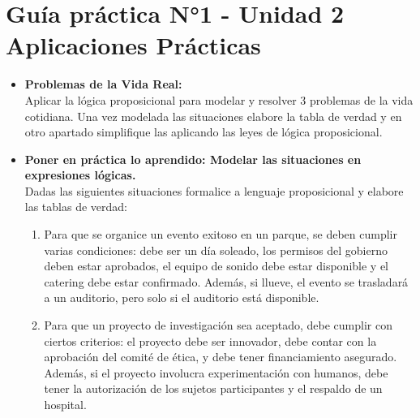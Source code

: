 \documentclass[12pt]{article}
\begin{document}
    
  
    \section*{\centering Guía práctica N°1 - Unidad 2\\Aplicaciones Prácticas}

        \vspace{0.6cm}
        \begin{itemize}
            \item \textbf{Problemas de la Vida Real:} \\Aplicar la lógica proposicional para modelar y resolver 3 problemas de la vida cotidiana. Una vez modelada las situaciones elabore la tabla de verdad y en otro apartado simplifique las aplicando las leyes de lógica proposicional.
            
            
            \item \textbf{ Poner en práctica lo aprendido: Modelar las situaciones en expresiones lógicas.}\\ Dadas las siguientes situaciones formalice a lenguaje proposicional y elabore las tablas de verdad: 
            
            \begin{enumerate}
                \item Para que se organice un evento exitoso en un parque, se deben cumplir varias condiciones: debe ser un día soleado, los permisos del gobierno deben estar aprobados, el equipo de sonido debe estar disponible y el catering debe estar confirmado. Además, si llueve, el evento se trasladará a un auditorio, pero solo si el auditorio está disponible.
                
                \item Para que un proyecto de investigación sea aceptado, debe cumplir con ciertos criterios: el proyecto debe ser innovador, debe contar con la aprobación del comité de ética, y debe tener financiamiento asegurado. Además, si el proyecto involucra experimentación con humanos, debe tener la autorización de los sujetos participantes y el respaldo de un hospital.
                

\end{enumerate}
\end{itemize}
\end{document}
